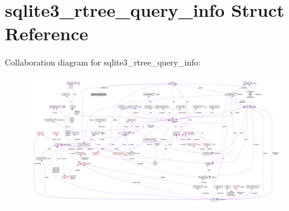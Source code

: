 \hypertarget{structsqlite3__rtree__query__info}{}\section{sqlite3\+\_\+rtree\+\_\+query\+\_\+info Struct Reference}
\label{structsqlite3__rtree__query__info}


Collaboration diagram for sqlite3\+\_\+rtree\+\_\+query\+\_\+info\+:\nopagebreak
\begin{figure}[H]
\begin{center}
\leavevmode
\includegraphics[width=350pt]{structsqlite3__rtree__query__info__coll__graph}
\end{center}
\end{figure}
